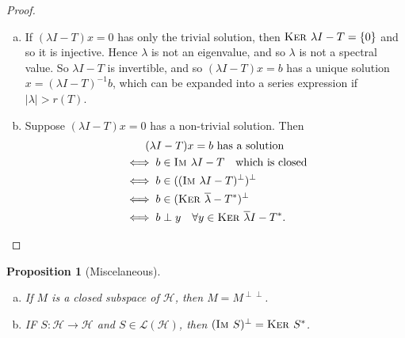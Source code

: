 \documentclass[10pt, oneside, reqno]{amsart}
\theoremstyle{plain}%
\newtheorem{prop}[thm]{Proposition}
\theoremstyle{definition}
\theoremstyle{remark}
\newcommand{\im}{\textsc{Im\ }}
\renewcommand{\ker}{\textsc{Ker\ }}
\begin{document}
\begin{proof}
    {\ } \begin{enumerate}[(a)]
        \item If $(\lambda I - T) x = 0$ has only the trivial solution, then $\ker \lambda I - T = \{ 0 \}$ and so it is injective.  Hence $\lambda$ is not an eigenvalue, and so $\lambda$ is not a spectral value.  So $\lambda I - T$ is invertible, and so $(\lambda I - T) x = b$ has a unique solution $x = (\lambda I - T)^{-1} b$, which can be expanded into a series expression if $|\lambda| > r(T)$.  
        \item Suppose $(\lambda I - T) x = 0$ has a non-trivial solution.  Then
        \begin{align*}
            &\qquad\text{$(\lambda I - T) x = b$ has a solution} \\
            &\iff b \in \im \lambda I - T \quad \text{which is closed} \\
            &\iff b \in ((\im \lambda I - T)^\perp)^\perp \\
            &\iff b \in (\ker \overline \lambda - T^*)^\perp \\
            &\iff b \perp y \quad \forall y \in \ker \overline \lambda I - T^*.\qedhere
        \end{align*}
    \end{enumerate}
\end{proof}

\begin{prop}[Miscelaneous]{\ }\begin{enumerate}[(a)]
    \item If $M$ is a closed subspace of $\mathcal H$, then $M = M^{\perp \perp}$. 
    \item IF $S: \mathcal H \rightarrow \mathcal H$ and $S \in \mathcal L(\mathcal H)$, then $(\im S)^\perp = \ker S^*$.  
\end{enumerate}
\end{prop}
\end{document}
